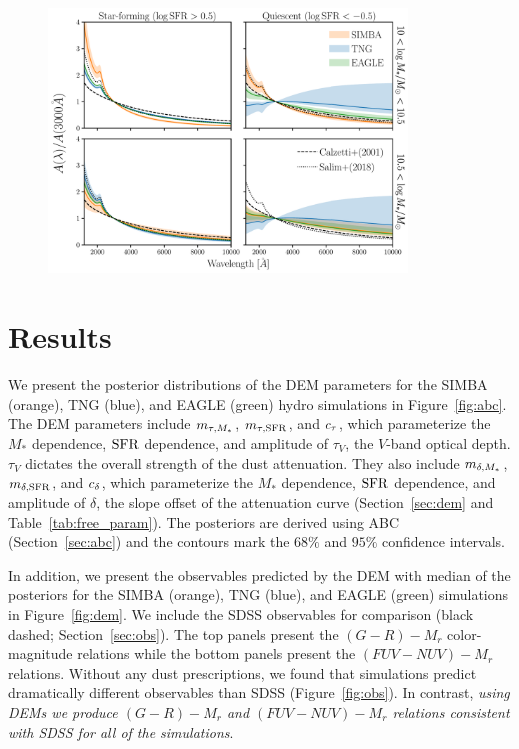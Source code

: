 \begin{figure}
\begin{center}
    \includegraphics[width=0.85\textwidth]{figs/abc_attenuation.pdf}
    \caption{\label{fig:atten}
    }
\end{center}
\end{figure}

\section{Results} \label{sec:results}
We present the posterior distributions of the DEM parameters for the SIMBA
(orange), TNG (blue), and EAGLE (green) hydro simulations in
Figure~\ref{fig:abc}. The DEM parameters include $m_{\tau,M_*}$, $m_{\tau,{\rm SFR}}$, and
$c_\tau$, which parameterize the $M_*$ dependence, ${\rm SFR}$ dependence, and 
amplitude of $\tau_V$, the $V$-band optical depth. $\tau_V$ dictates the
overall strength of the dust attenuation. They also include $m_{\delta,M_*}$,
$m_{\delta,{\rm SFR}}$, and $c_\delta$, which parameterize the $M_*$ dependence, ${\rm SFR}$ dependence,
and amplitude of $\delta$, the slope offset of the attenuation curve
(Section~\ref{sec:dem} and Table~\ref{tab:free_param}). The posteriors 
are derived using ABC (Section~\ref{sec:abc}) and the contours mark the 
$68\%$ and $95\%$ confidence intervals. 

In addition, we present the observables predicted by the DEM with median of the
posteriors for the SIMBA (orange), TNG (blue), and EAGLE (green) simulations 
in Figure~\ref{fig:dem}. We include the SDSS observables for comparison
(black dashed; Section~\ref{sec:obs}). The top panels present the $(G-R) - M_r$ 
color-magnitude relations while the bottom panels present the $(FUV-NUV) - M_r$
relations. Without any dust prescriptions, we found that simulations predict
dramatically different observables than SDSS (Figure~\ref{fig:obs}). 
In contrast, {\em using DEMs we produce $(G-R) - M_r$ and $(FUV-NUV) - M_r$
relations consistent with SDSS for all of the simulations}. 


